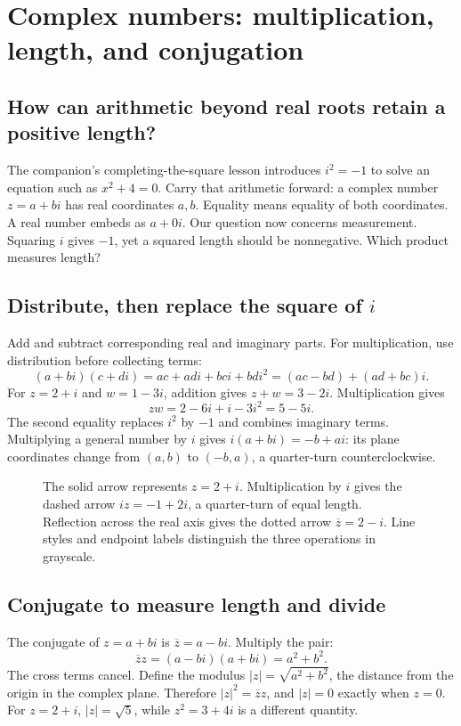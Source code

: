 \chapter{Complex numbers: multiplication, length, and conjugation}
\label{learn:complex_numbers}


\section{How can arithmetic beyond real roots retain a positive length?}
The companion's completing-the-square lesson introduces $i^2=-1$ to solve
an equation such as $x^2+4=0$. Carry that arithmetic forward: a complex
number $z=a+bi$ has real coordinates $a,b$. Equality means equality of
both coordinates. A real number embeds as $a+0i$.
Our question now concerns measurement. Squaring $i$ gives $-1$, yet a
squared length should be nonnegative. Which product measures length?

\section{Distribute, then replace the square of \texorpdfstring{$i$}{i}}
Add and subtract corresponding real and imaginary parts. For multiplication,
use distribution before collecting terms:
\[
 (a+bi)(c+di)=ac+adi+bci+bdi^2=(ac-bd)+(ad+bc)i.
\]
For $z=2+i$ and $w=1-3i$, addition gives $z+w=3-2i$.
Multiplication gives
\[
 zw=2-6i+i-3i^2=5-5i.
\]
The second equality replaces $i^2$ by $-1$ and combines imaginary terms.
Multiplying a general number by $i$ gives $i(a+bi)=-b+ai$: its plane
coordinates change from $(a,b)$ to $(-b,a)$, a quarter-turn counterclockwise.

\begin{figure}[htbp]
\centering

\caption{The solid arrow represents $z=2+i$. Multiplication by $i$ gives
the dashed arrow $iz=-1+2i$, a quarter-turn of equal length. Reflection
across the real axis gives the dotted arrow $\overline z=2-i$. Line styles
and endpoint labels distinguish the three operations in grayscale.}
\end{figure}

\section{Conjugate to measure length and divide}
The conjugate of $z=a+bi$ is $\overline z=a-bi$. Multiply the pair:
\[
 \overline z z=(a-bi)(a+bi)=a^2+b^2.
\]
The cross terms cancel. Define the modulus $|z|=\sqrt{a^2+b^2}$,
the distance from the origin in the complex plane. Therefore
$|z|^2=\overline z z$, and $|z|=0$ exactly when $z=0$.
For $z=2+i$, $|z|=\sqrt5$, while $z^2=3+4i$ is a different quantity.

